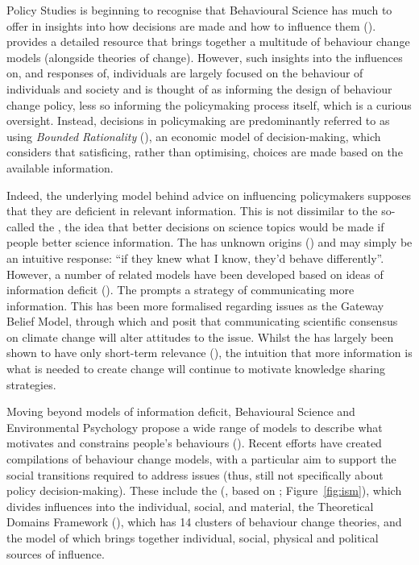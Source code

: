 Policy Studies is beginning to recognise that Behavioural Science has much to offer in insights into how decisions are made and how to influence them (\cite{CairneyW2017}). \textcite{Darnton2008} provides a detailed resource that brings together a multitude of behaviour change models (alongside theories of change). However, such insights into the influences on, and responses of, individuals are largely focused on the behaviour of individuals and society and is thought of as informing the design of behaviour change policy,  less so informing the policymaking process itself, which is a curious oversight. Instead, decisions in policymaking are predominantly referred to as using \emph{Bounded Rationality} (\cite{CairneyO2020,CairneyTS2023}), an economic model of decision-making, which considers that satisficing, rather than optimising, choices are made based on the available information. 

Indeed, the underlying model behind advice on influencing policymakers supposes that they are deficient in relevant information. This is not dissimilar to the so-called the \IDM{}, the idea that better decisions on science topics would be made if people better science information. The \IDM{} has unknown origins (\cite{Nerlich2017}) and may simply be an intuitive response: ``if they knew what I know, they'd behave differently''. However, a number of related models have been developed based on ideas of information deficit (\cite{Darnton2008}). The \IDM{} prompts a strategy of communicating more information. This has been more formalised regarding \CAN{} issues as the Gateway Belief Model, through which \textcite{vanderLindenLFM2015} and \textcite{vanderLinden2021} posit that communicating scientific consensus on climate change will alter attitudes to the issue. Whilst the \IDM{} has largely been shown to have only short-term relevance (\cite[p24-5]{BA2024trust}), the intuition that more information is what is needed to create change will continue to motivate knowledge sharing strategies.

Moving beyond models of information deficit, Behavioural Science and Environmental Psychology propose a wide range of models to describe what motivates and constrains people's behaviours (\cite{Darnton2008}). Recent efforts have created compilations of behaviour change models, with a particular aim to support the social transitions required to address \CAN{} issues (thus, still not specifically about policy decision-making). These include the \ISM{} (\cite{DarntonH2013}, based on \cite{SouthertonME2011}; Figure~\ref{fig:ism}), which divides influences into the individual, social, and material, the Theoretical Domains Framework (\cite{AtkinsFIOPIFDCGLM2017}), which has 14 clusters of behaviour change theories, and the model of \textcite{HamptonW2023} which brings together individual, social, physical and political sources of influence.

